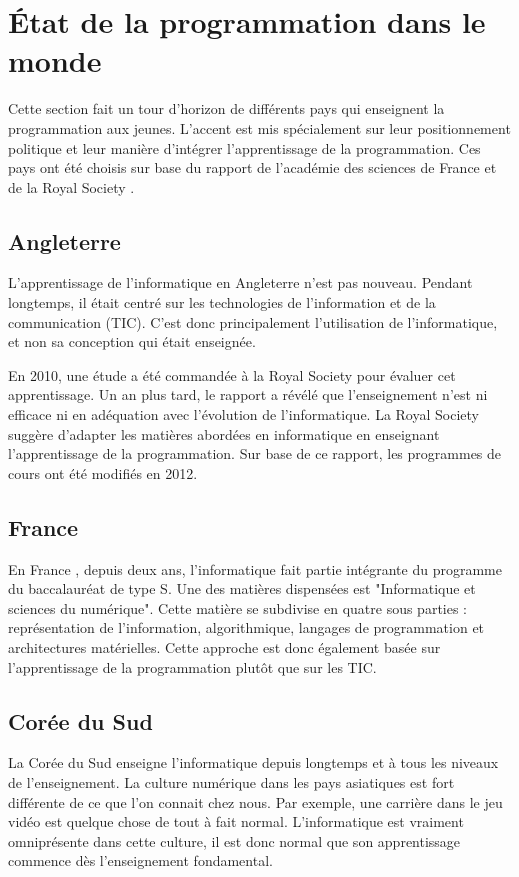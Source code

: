 \section{État de la programmation dans le monde}
\label{monde}
Cette section fait un tour d'horizon de différents pays qui enseignent la programmation aux jeunes. L'accent est mis spécialement sur leur positionnement politique et leur manière d'intégrer l'apprentissage de la programmation. Ces pays ont été choisis sur base du rapport de l'académie des sciences de France \cite{ens-info-fr} et de la Royal Society \cite{comput-school}.

\subsection{Angleterre}
L'apprentissage de l'informatique en Angleterre \cite{status-guid} n'est pas nouveau. Pendant longtemps, il était centré sur les technologies de l'information et de la communication (TIC). C'est donc principalement l'utilisation de l'informatique, et non sa conception qui était enseignée.

En 2010, une étude a été commandée à la Royal Society pour évaluer cet apprentissage. Un an plus tard, le rapport a révélé que l'enseignement n'est ni efficace ni en adéquation avec l'évolution de l'informatique. La Royal Society suggère d'adapter les matières abordées en informatique en enseignant l'apprentissage de la programmation. Sur base de ce rapport, les programmes de cours ont été modifiés en 2012.

\subsection{France}
En France \cite{wiki-info-et-sc-du-num} \cite{wiki-bac-sc}, depuis deux ans, l'informatique fait partie intégrante du programme du baccalauréat de type S. Une des matières dispensées est "Informatique et sciences du numérique". Cette matière se subdivise en quatre sous parties : représentation de l'information, algorithmique, langages de programmation et architectures matérielles. Cette approche est donc également basée sur l'apprentissage de la programmation plutôt que sur les TIC.

\subsection{Corée du Sud}
La Corée du Sud enseigne l'informatique depuis longtemps et à tous les niveaux de l'enseignement. La culture numérique dans les pays asiatiques est fort différente de ce que l'on connait chez nous. Par exemple, une carrière dans le jeu vidéo est quelque chose de tout à fait normal. L'informatique est vraiment omniprésente dans cette culture, il est donc normal que son apprentissage commence dès l'enseignement \gls{fondamental}.

